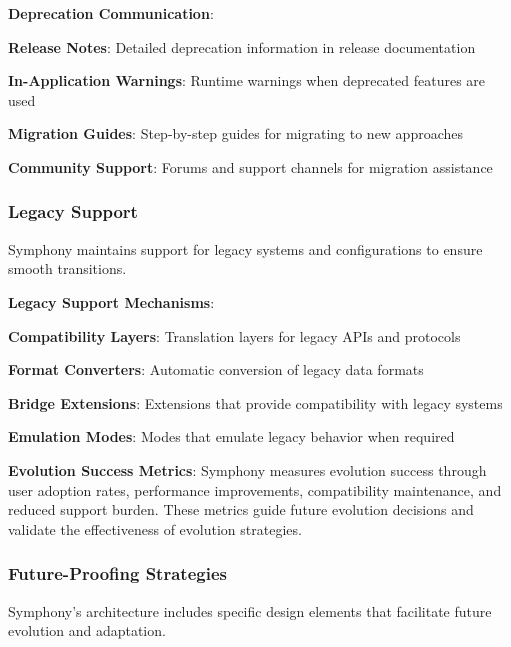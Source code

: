 \textbf{Deprecation Communication}:
\begin{compactlist}
    \item \textbf{Release Notes}: Detailed deprecation information in release documentation
    \item \textbf{In-Application Warnings}: Runtime warnings when deprecated features are used
    \item \textbf{Migration Guides}: Step-by-step guides for migrating to new approaches
    \item \textbf{Community Support}: Forums and support channels for migration assistance
\end{compactlist}

\subsubsection*{Legacy Support}

Symphony maintains support for legacy systems and configurations to ensure smooth transitions.

\textbf{Legacy Support Mechanisms}:
\begin{compactlist}
    \item \textbf{Compatibility Layers}: Translation layers for legacy APIs and protocols
    \item \textbf{Format Converters}: Automatic conversion of legacy data formats
    \item \textbf{Bridge Extensions}: Extensions that provide compatibility with legacy systems
    \item \textbf{Emulation Modes}: Modes that emulate legacy behavior when required
\end{compactlist}

\begin{successbox}
\textbf{Evolution Success Metrics}: Symphony measures evolution success through user adoption rates, performance improvements, compatibility maintenance, and reduced support burden. These metrics guide future evolution decisions and validate the effectiveness of evolution strategies.
\end{successbox}

\subsubsection*{Future-Proofing Strategies}

Symphony's architecture includes specific design elements that facilitate future evolution and adaptation.

